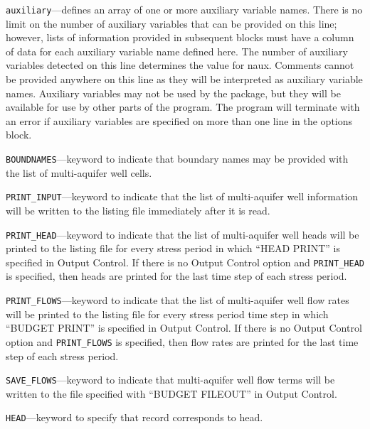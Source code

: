 
\item \texttt{auxiliary}---defines an array of one or more auxiliary variable names.  There is no limit on the number of auxiliary variables that can be provided on this line; however, lists of information provided in subsequent blocks must have a column of data for each auxiliary variable name defined here.   The number of auxiliary variables detected on this line determines the value for naux.  Comments cannot be provided anywhere on this line as they will be interpreted as auxiliary variable names.  Auxiliary variables may not be used by the package, but they will be available for use by other parts of the program.  The program will terminate with an error if auxiliary variables are specified on more than one line in the options block.

\item \texttt{BOUNDNAMES}---keyword to indicate that boundary names may be provided with the list of multi-aquifer well cells.

\item \texttt{PRINT\_INPUT}---keyword to indicate that the list of multi-aquifer well information will be written to the listing file immediately after it is read.

\item \texttt{PRINT\_HEAD}---keyword to indicate that the list of multi-aquifer well heads will be printed to the listing file for every stress period in which ``HEAD PRINT'' is specified in Output Control.  If there is no Output Control option and \texttt{PRINT\_HEAD} is specified, then heads are printed for the last time step of each stress period.

\item \texttt{PRINT\_FLOWS}---keyword to indicate that the list of multi-aquifer well flow rates will be printed to the listing file for every stress period time step in which ``BUDGET PRINT'' is specified in Output Control.  If there is no Output Control option and \texttt{PRINT\_FLOWS} is specified, then flow rates are printed for the last time step of each stress period.

\item \texttt{SAVE\_FLOWS}---keyword to indicate that multi-aquifer well flow terms will be written to the file specified with ``BUDGET FILEOUT'' in Output Control.

\item \texttt{HEAD}---keyword to specify that record corresponds to head.

